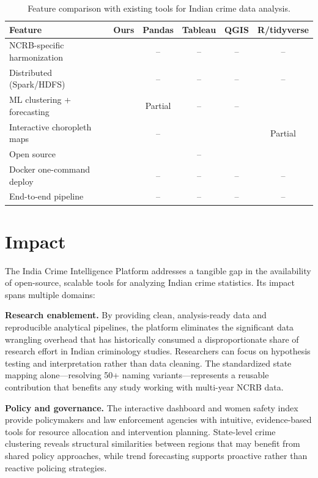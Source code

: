 \documentclass[a4paper,12pt]{article}
\newcommand{\cmark}{\ding{51}}
\begin{document}
\begin{table}[h!]
\small
\centering
\begin{tabularx}{\textwidth}{|l|c|c|c|c|c|}
\hline
\textbf{Feature} & \textbf{Ours} & \textbf{Pandas} & \textbf{Tableau} & \textbf{QGIS} & \textbf{R/tidyverse} \\
\hline
NCRB-specific harmonization & \cmark & -- & -- & -- & -- \\
\hline
Distributed (Spark/HDFS) & \cmark & -- & -- & -- & -- \\
\hline
ML clustering + forecasting & \cmark & Partial & -- & -- & \cmark \\
\hline
Interactive choropleth maps & \cmark & -- & \cmark & \cmark & Partial \\
\hline
Open source & \cmark & \cmark & -- & \cmark & \cmark \\
\hline
Docker one-command deploy & \cmark & -- & -- & -- & -- \\
\hline
End-to-end pipeline & \cmark & -- & -- & -- & -- \\
\hline
\end{tabularx}
\caption{Feature comparison with existing tools for Indian crime data analysis.}
\end{table}

\section{Impact}

The India Crime Intelligence Platform addresses a tangible gap in the availability of open-source, scalable tools for analyzing Indian crime statistics. Its impact spans multiple domains:

\textbf{Research enablement.} By providing clean, analysis-ready data and reproducible analytical pipelines, the platform eliminates the significant data wrangling overhead that has historically consumed a disproportionate share of research effort in Indian criminology studies. Researchers can focus on hypothesis testing and interpretation rather than data cleaning. The standardized state mapping alone---resolving 50+ naming variants---represents a reusable contribution that benefits any study working with multi-year NCRB data.

\textbf{Policy and governance.} The interactive dashboard and women safety index provide policymakers and law enforcement agencies with intuitive, evidence-based tools for resource allocation and intervention planning. State-level crime clustering reveals structural similarities between regions that may benefit from shared policy approaches, while trend forecasting supports proactive rather than reactive policing strategies.
\end{document}
